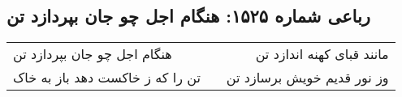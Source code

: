 \begin{center}
\section*{رباعی شماره ۱۵۲۵: هنگام اجل چو جان بپردازد تن}
\label{sec:1525}
\begin{longtable}{l p{0.5cm} r}
هنگام اجل چو جان بپردازد تن
&&
مانند قبای کهنه اندازد تن
\\
تن را که ز خاکست دهد باز به خاک
&&
وز نور قدیم خویش برسازد تن
\\
\end{longtable}
\end{center}
